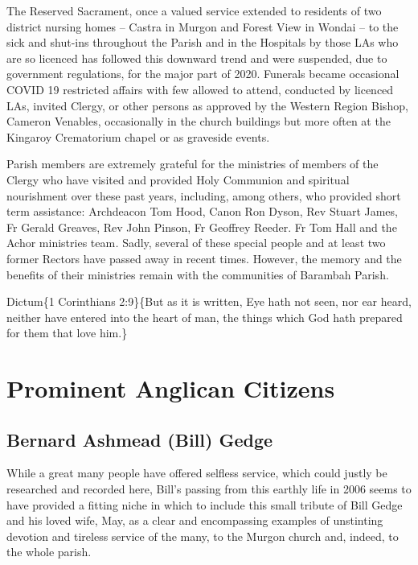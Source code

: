 The Reserved Sacrament, once a valued service extended to residents of two district nursing homes -- Castra in Murgon and Forest View in Wondai -- to the sick and shut-ins throughout the Parish and in the Hospitals by those LAs who are so licenced has followed this downward trend and were suspended, due to government regulations, for the major part of 2020. Funerals became occasional COVID 19 restricted affairs with few allowed to attend, conducted by licenced LAs, invited Clergy, or other persons as approved by the Western Region Bishop, Cameron Venables, occasionally in the church buildings but more often at the Kingaroy Crematorium chapel or as graveside events.

Parish members are extremely grateful for the ministries of members of the Clergy who have visited and provided Holy Communion and spiritual nourishment over these past years, including, among others, who provided short term assistance: Archdeacon Tom Hood, Canon Ron Dyson, Rev Stuart James, Fr Gerald Greaves, Rev John Pinson, Fr Geoffrey Reeder. Fr Tom Hall and the Achor ministries team\emph{.} Sadly, several of these special people and at least two former Rectors have passed away in recent times. However, the memory and the benefits of their ministries remain with the communities of Barambah Parish.

Dictum\{1 Corinthians 2:9\}\{But as it is written, Eye hath not seen, nor ear heard, neither have entered into the heart of man, the things which God hath prepared for them that love him.\}

\hypertarget{prominent-anglican-citizens}{%
\chapter{Prominent Anglican Citizens}\label{prominent-anglican-citizens}}

\hypertarget{bernard-ashmead-bill-gedge}{%
\section{Bernard Ashmead (Bill) Gedge}\label{bernard-ashmead-bill-gedge}}

While a great many people have offered selfless service, which could justly be researched and recorded here, Bill's passing from this earthly life in 2006 seems to have provided a fitting niche in which to include this small tribute of Bill Gedge and his loved wife, May, as a clear and encompassing examples of unstinting devotion and tireless service of the many, to the Murgon church and, indeed, to the whole parish.

